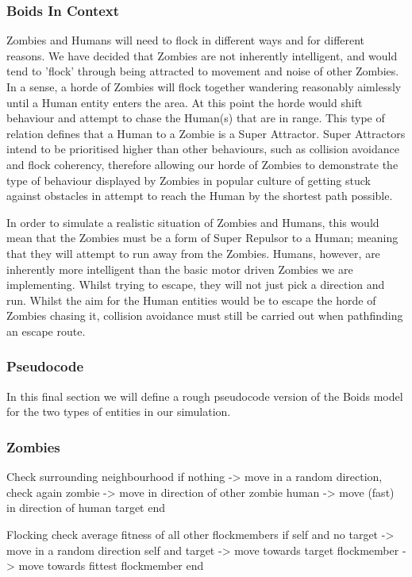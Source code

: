 \subsubsection{Boids In Context}
Zombies and Humans will need to flock in different ways and for different reasons. We have decided that Zombies are not inherently intelligent, and would tend to 'flock' through being attracted to movement and noise of other Zombies. In a sense, a horde of Zombies will flock together wandering reasonably aimlessly until a Human entity enters the area. At this point the horde would shift behaviour and attempt to chase the Human(s) that are in range. This type of relation defines that a Human to a Zombie is a Super Attractor. Super Attractors intend to be prioritised higher than other behaviours, such as collision avoidance and flock coherency, therefore allowing our horde of Zombies to demonstrate the type of behaviour displayed by Zombies in popular culture of getting stuck against obstacles in attempt to reach the Human by the shortest path possible.

In order to simulate a realistic situation of Zombies and Humans, this would mean that the Zombies must be a form of Super Repulsor to a Human; meaning that they will attempt to run away from the Zombies. Humans, however, are inherently more intelligent than the basic motor driven Zombies we are implementing. Whilst trying to escape, they will not just pick a direction and run. Whilst the aim for the Human entities would be to escape the horde of Zombies chasing it, collision avoidance must still be carried out when pathfinding an escape route. 

\subsubsection{Pseudocode}
In this final section we will define a rough pseudocode version of the Boids model for the two types of entities in our simulation.

\subsubsection{Zombies}
Check surrounding neighbourhood
if	nothing 	->	move in a random direction, check again
	zombie 		->	move in direction of other zombie
	human 		->	move (fast) in direction of human target
end

Flocking
	check average fitness of all other flockmembers
	if 	self and no target 	->	move in a random direction
		self and target		-> 	move towards target
		flockmember 		-> 	move towards fittest flockmember
	end
\clearpage
\endinput